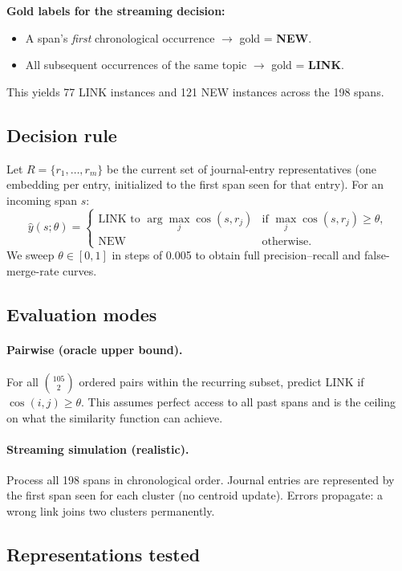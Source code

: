 \documentclass[11pt,a4paper]{article}
\begin{document}
\textbf{Gold labels for the streaming decision:}
\begin{itemize}[noitemsep]
  \item A span's \emph{first} chronological occurrence $\to$ gold = \textbf{NEW}.
  \item All subsequent occurrences of the same topic $\to$ gold = \textbf{LINK}.
\end{itemize}
This yields 77 LINK instances and 121 NEW instances across the 198 spans.

\subsection{Decision rule}

Let $R = \{r_1, \ldots, r_m\}$ be the current set of journal-entry representatives
(one embedding per entry, initialized to the first span seen for that entry).
For an incoming span $s$:
\[
  \hat{y}(s; \theta) =
  \begin{cases}
    \text{LINK to } \arg\max_j \cos(s, r_j) & \text{if } \max_j \cos(s, r_j) \ge \theta,\\
    \text{NEW} & \text{otherwise.}
  \end{cases}
\]
We sweep $\theta \in [0, 1]$ in steps of 0.005 to obtain full precision--recall and
false-merge-rate curves.

\subsection{Evaluation modes}

\paragraph{Pairwise (oracle upper bound).}
For all $\binom{105}{2}$ ordered pairs within the recurring subset, predict LINK if
$\cos(i,j) \ge \theta$.  This assumes perfect access to all past spans and is the ceiling
on what the similarity function can achieve.

\paragraph{Streaming simulation (realistic).}
Process all 198 spans in chronological order.  Journal entries are represented by the
first span seen for each cluster (no centroid update).  Errors propagate: a wrong link
joins two clusters permanently.

\subsection{Representations tested}
\end{document}
